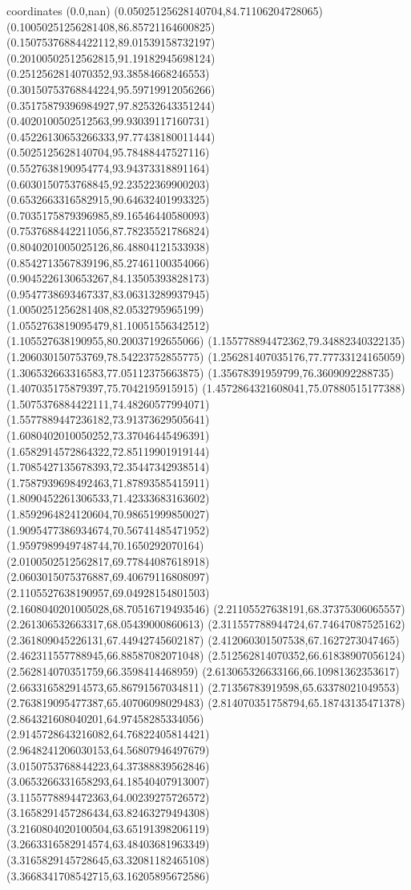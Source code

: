 coordinates {%
(0.0,nan)
(0.05025125628140704,84.71106204728065)
(0.10050251256281408,86.85721164600825)
(0.15075376884422112,89.01539158732197)
(0.20100502512562815,91.19182945698124)
(0.2512562814070352,93.38584668246553)
(0.30150753768844224,95.59719912056266)
(0.35175879396984927,97.82532643351244)
(0.4020100502512563,99.93039117160731)
(0.45226130653266333,97.77438180011444)
(0.5025125628140704,95.78488447527116)
(0.5527638190954774,93.94373318891164)
(0.6030150753768845,92.23522369900203)
(0.6532663316582915,90.64632401993325)
(0.7035175879396985,89.16546440580093)
(0.7537688442211056,87.78235521786824)
(0.8040201005025126,86.48804121533938)
(0.8542713567839196,85.27461100354066)
(0.9045226130653267,84.13505393828173)
(0.9547738693467337,83.06313289937945)
(1.0050251256281408,82.0532795965199)
(1.0552763819095479,81.10051556342512)
(1.105527638190955,80.20037192655066)
(1.155778894472362,79.34882340322135)
(1.206030150753769,78.54223752855775)
(1.256281407035176,77.77733124165059)
(1.306532663316583,77.05112375663875)
(1.35678391959799,76.3609092288735)
(1.407035175879397,75.7042195915915)
(1.4572864321608041,75.07880515177388)
(1.5075376884422111,74.48260577994071)
(1.5577889447236182,73.91373629505641)
(1.6080402010050252,73.37046445496391)
(1.6582914572864322,72.85119901919144)
(1.7085427135678393,72.35447342938514)
(1.7587939698492463,71.87893585415911)
(1.8090452261306533,71.42333683163602)
(1.8592964824120604,70.98651999850027)
(1.9095477386934674,70.56741485471952)
(1.9597989949748744,70.1650292070164)
(2.0100502512562817,69.77844087618918)
(2.0603015075376887,69.40679116808097)
(2.1105527638190957,69.04928154801503)
(2.1608040201005028,68.70516719493546)
(2.21105527638191,68.37375306065557)
(2.261306532663317,68.05439000860613)
(2.311557788944724,67.74647087525162)
(2.361809045226131,67.44942745602187)
(2.412060301507538,67.1627273047465)
(2.462311557788945,66.88587082071048)
(2.512562814070352,66.61838907056124)
(2.562814070351759,66.3598414468959)
(2.613065326633166,66.10981362353617)
(2.663316582914573,65.86791567034811)
(2.71356783919598,65.63378021049553)
(2.763819095477387,65.40706098029483)
(2.814070351758794,65.18743135471378)
(2.864321608040201,64.97458285334056)
(2.9145728643216082,64.76822405814421)
(2.9648241206030153,64.56807946497679)
(3.0150753768844223,64.37388839562846)
(3.0653266331658293,64.18540407913007)
(3.1155778894472363,64.00239275726572)
(3.1658291457286434,63.82463279494308)
(3.2160804020100504,63.65191398206119)
(3.2663316582914574,63.48403681963349)
(3.3165829145728645,63.32081182465108)
(3.3668341708542715,63.16205895672586)
}

